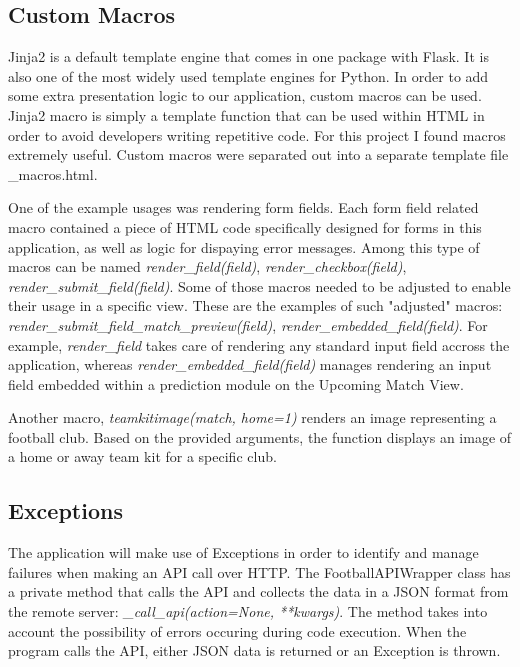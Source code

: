 \subsection{Custom Macros}
Jinja2 is a default template engine that comes in one package with Flask. It is also one of the most widely used template engines for Python. In order to add some extra presentation logic to our application, custom macros can be used. Jinja2 macro is simply a template function that can be used within HTML in order to avoid developers writing repetitive code. For this project I found macros extremely useful. Custom macros were separated out into a separate template file \_macros.html.

One of the example usages was rendering form fields. Each form field related macro contained a piece of HTML code specifically designed for forms in this application, as well as logic for dispaying error messages. Among this type of macros can be named \emph{render\_field(field)}, \emph{render\_checkbox(field)}, \emph{render\_submit\_field(field)}. Some of those macros needed to be adjusted to enable their usage in a specific view. These are the examples of such "adjusted" macros: \emph{render\_submit\_field\_match\_preview(field)}, \emph{render\_embedded\_field(field)}. For example, \emph{render\_field} takes care of rendering any standard input field accross the application, whereas \emph{render\_embedded\_field(field)} manages rendering an input field embedded within a prediction module on the Upcoming Match View. 

Another macro, \emph{teamkitimage(match, home=1)} renders an image representing a football club. Based on the provided arguments, the function displays an image of a home or away team kit for a specific club. 

\subsection{Exceptions}
The application will make use of Exceptions in order to identify and manage failures when making an API call over HTTP. The FootballAPIWrapper class has a private method that calls the API and collects the data in a JSON format from the remote server: \emph{\_call\_api(action=None, **kwargs)}. The method takes into account the possibility of errors occuring during code execution. When the program calls the API, either JSON data is returned or an Exception is thrown. 

